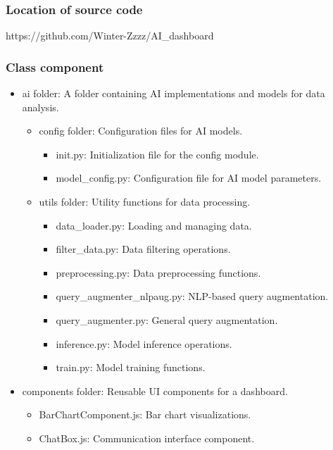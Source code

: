 \documentclass[conference]{IEEEtran}
\begin{document}
\subsubsection{Location of source code}
https://github.com/Winter-Zzzz/AI\_dashboard

\subsubsection{Class component}
\begin{itemize}
	\item ai folder: A folder containing AI implementations and models for data analysis.
	      \begin{itemize}
	      	\item config folder: Configuration files for AI models.
	      	      \begin{itemize}
	      	      	\item init.py: Initialization file for the config module.
	      	      	\item model\_config.py: Configuration file for AI model parameters.
	      	      \end{itemize}
	      	\item utils folder: Utility functions for data processing.
	      	      \begin{itemize}
	      	      	\item data\_loader.py: Loading and managing data.
	      	      	\item filter\_data.py: Data filtering operations.
	      	      	\item preprocessing.py: Data preprocessing functions.
	      	      	\item query\_augmenter\_nlpaug.py: NLP-based query augmentation.
	      	      	\item query\_augmenter.py: General query augmentation.
	      	      	\item inference.py: Model inference operations.
	      	      	\item train.py: Model training functions.
	      	      \end{itemize}
	      \end{itemize}
	\item components folder: Reusable UI components for a dashboard.
	      \begin{itemize}
	      	\item BarChartComponent.js: Bar chart visualizations.
	      	\item ChatBox.js: Communication interface component.

\end{itemize}
\end{itemize}
\end{document}
